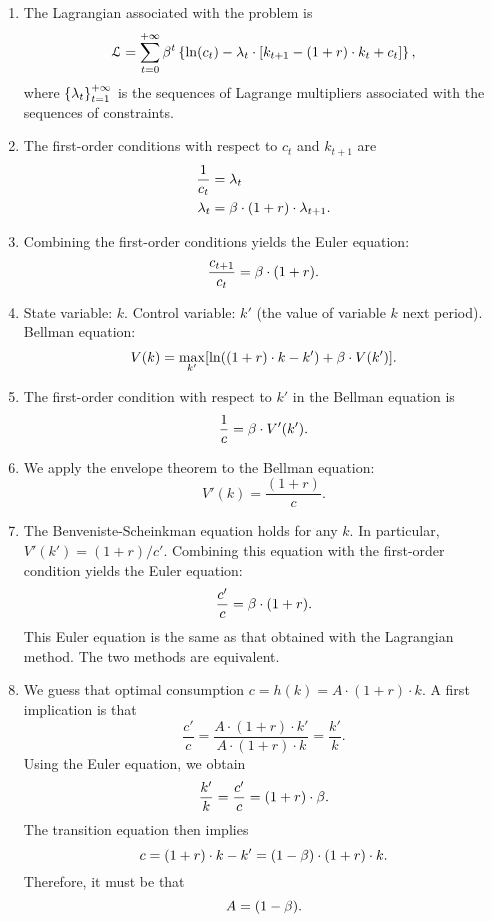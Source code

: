 \documentclass[letterpaper,12pt,leqno]{article}
\begin{document}
\begin{enumerate}
\item The Lagrangian associated with the problem is
\begin{align*}
\Lc=\sum_{t=0}^{+\infty}\b^t \bc{\ln(c_t)-\l_{t}\cdot [k_{t+1}-(1+r)\cdot k_{t}+c_{t}]},
\end{align*}
where  $\left\lbrace \lambda_t \right\rbrace_{t=1}^{+\infty}$ is the sequences of Lagrange multipliers associated with the sequences of constraints.

\item The first-order conditions with respect to $c_{t}$ and $k_{t+1}$ are
\begin{align*}
\frac{1}{c_{t}}&= \lambda_{t}\\
\lambda_{t}&= \beta\cdot(1+r)\cdot\lambda_{t+1}.
\end{align*}

\item Combining the first-order conditions yields the Euler equation:
\[\frac{c_{t+1}}{c_{t}}=\beta\cdot (1+r).\]

\item State variable: $k$. Control variable: $k'$ (the value of variable $k$ next period). Bellman equation:
\[V(k)=\max_{k'} [\ln((1+r)\cdot k-k')+\b\cdot V(k')].\]

\item  The first-order condition with respect to $k'$ in the Bellman equation is
\[\frac{1}{c}=\beta\cdot V'(k').\]

\item We apply the envelope theorem to the Bellman equation:
\[V'(k)=\frac{(1+r)}{c}.\]

\item The Benveniste-Scheinkman equation holds for any $k$. In particular, $V'(k')=(1+r)/c'$. Combining this equation with the first-order condition yields the Euler equation:
\[\frac{c'}{c}=\beta\cdot (1+r).\]
This Euler equation is the same as that obtained with the Lagrangian method. The two methods are equivalent.

\item We guess that optimal consumption $c=h(k)=A\cdot (1+r)\cdot k$. A first implication is that
\[\frac{c'}{c}=\frac{A\cdot (1+r)\cdot k'}{A\cdot (1+r)\cdot k}=\frac{k'}{k}.\]
Using the Euler equation, we obtain
\[\frac{k'}{k}= \frac{c'}{c}=(1+r)\cdot \beta.\]
The transition equation then implies \[c=(1+r)\cdot k-k'=(1-\beta)\cdot (1+r)\cdot k.\] Therefore, it must be that \[A=(1-\beta).\] 


\end{enumerate}
\end{document}
